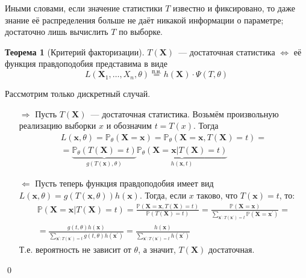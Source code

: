 \documentclass[oneside,final,14pt]{extreport}
\renewenvironment{proof}{{\bfseries Доказательство.}}{\qed}
\theoremstyle{plain}
\theoremstyle{definition}
\theoremstyle{named}
\newtheorem*{namedthm}{Теорема}
\begin{document}
Иными словами, если значение статистики $T$ известно и фиксировано, то даже знание её распределения больше не даёт никакой информации о параметре; достаточно лишь вычислить $T$ по выборке.

\begin{namedthm}[Критерий факторизации]
$T(\mathbf{X})$~--- достаточная статистика $\Leftrightarrow$ её функция правдоподобия представима в виде 
\begin{equation*}
    L(\mathbf{X}_{1}, \ldots, X_{n} , \theta) \stackrel{\text{п.н.}}{=} h(\mathbf{X}) \cdot \Psi(T, \theta)
\end{equation*}
\end{namedthm}

\begin{proof}
Рассмотрим только дискретный случай. 
\begin{enumerate}
    \item[$\Rightarrow$] Пусть $T(\mathbf{X})$~--- достаточная статистика. %
    Возьмём произвольную реализацию выборки $x$ и обозначим $t = T(x)$. Тогда
    \begin{multline*}
        L(\mathbf{x}, \theta) = \mathbb{P}_{\theta}(\mathbf{X}=\mathbf{x})=\mathbb{P}_{\theta}(\mathbf{X}=\mathbf{x}, T(\mathbf{X})=t) =\\
        = \underbrace{\mathbb{P}_{\theta}(T(\mathbf{X})=t)}_{g(T(\mathbf{x}), \theta)} \underbrace{\mathbb{P}_{\theta}(\mathbf{X}=\mathbf{x} | T(\mathbf{X})=t)}_{h(\mathbf{x}, t)}
    \end{multline*}
    \item[$\Leftarrow$] Пусть теперь функция правдоподобия имеет вид $L(\mathbf{x}, \theta)=g(T(\mathbf{x}, \theta)) h(\mathbf{x})$. Тогда, если $x$ таково, что $T(\mathbf{x})=t$, то:
    \begin{multline*}
        \mathbb{P}(\mathbf{X}=\mathbf{x} | T(\mathbf{X})=t) =\frac{\mathbb{P}(\mathbf{X}=\mathbf{x}, T(\mathbf{X})=t)}{\mathbb{P}(T(\mathbf{X})=t)}
        =\frac{\mathbb{P}(\mathbf{X}=\mathbf{x})}{\sum\limits_{\mathbf{x}^{\prime}: T(\mathbf{x}^{\prime})=t} \mathbb{P}(\mathbf{X}=\mathbf{x}^{\prime})} = \\
        = \frac{g(t, \theta) h(\mathbf{x})}{\sum\limits_{\mathbf{x}^{\prime}: T(\mathbf{x}^{\prime})=t} g(t, \theta) h(\mathbf{x}^{\prime})}
        = \frac{h(\mathbf{x})}{\sum\limits_{\mathbf{x}^{\prime}: T(\mathbf{x}^{\prime})=t} h(\mathbf{x}^{\prime})}
    \end{multline*}
    Т.е. вероятность не зависит от $\theta$, а значит, $T(\mathbf{X})$ достаточная.
\end{enumerate}
\end{proof}
\end{document}

